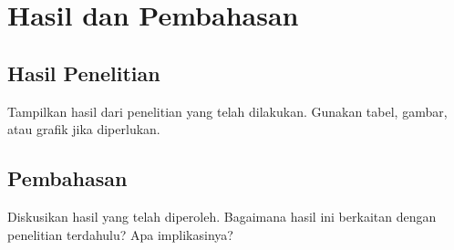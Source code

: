 \chapter{Hasil dan Pembahasan}
\section{Hasil Penelitian}
Tampilkan hasil dari penelitian yang telah dilakukan. Gunakan tabel, gambar, atau grafik jika diperlukan.

\section{Pembahasan}
Diskusikan hasil yang telah diperoleh. Bagaimana hasil ini berkaitan dengan penelitian terdahulu? Apa implikasinya?
